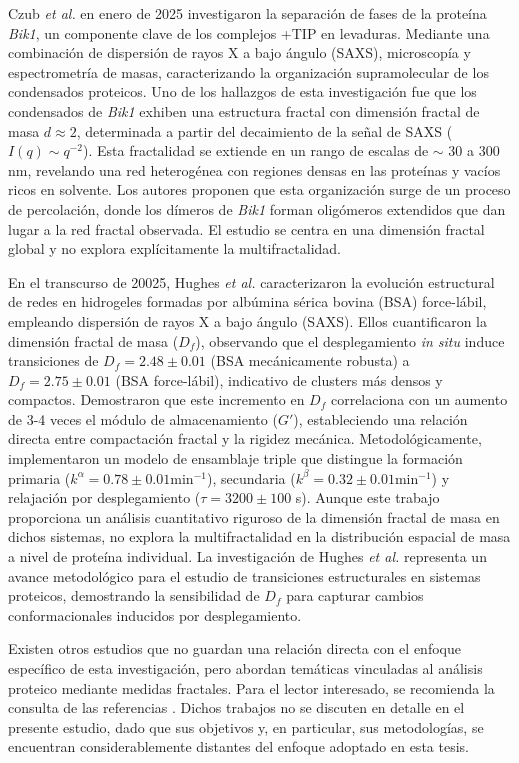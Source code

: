 Czub \textit{et al.} en enero de 2025 \cite{Czub2025} investigaron la separación de fases de la proteína \textit{Bik1}, un componente clave de los complejos +TIP en levaduras. Mediante una combinación de dispersión de rayos X a bajo ángulo (SAXS), microscopía y espectrometría de masas, caracterizando la organización supramolecular de los condensados proteicos. Uno de los hallazgos de esta investigación fue que los condensados de \textit{Bik1} exhiben una estructura fractal con dimensión fractal de masa $d \approx 2$, determinada a partir del decaimiento de la señal de SAXS  ($I(q) \sim q^{-2}$). Esta fractalidad se extiende en un rango de escalas de $\sim$ 30 a 300 nm, revelando una red heterogénea con regiones densas en las proteínas y vacíos ricos en solvente. Los autores proponen que esta organización surge de un proceso de percolación, donde los dímeros de \textit{Bik1} forman oligómeros extendidos que dan lugar a la red fractal observada. El estudio se centra en una dimensión fractal global y no explora explícitamente la multifractalidad.

En el transcurso de 20025, Hughes \textit{et al.} \cite{Hughes2025} caracterizaron la evolución estructural de redes en hidrogeles formadas por albúmina sérica bovina (BSA) force-lábil, empleando dispersión de rayos X a bajo ángulo (SAXS). Ellos cuantificaron la dimensión fractal de masa ($D_f$), observando que el desplegamiento \textit{in situ} induce transiciones de $D_f = 2.48 \pm 0.01$ (BSA mecánicamente robusta) a $D_f = 2.75 \pm 0.01$ (BSA force-lábil), indicativo de clusters más densos y compactos. Demostraron que este incremento en $D_f$ correlaciona con un aumento de 3-4 veces el módulo de almacenamiento ($G'$), estableciendo una relación directa entre compactación fractal y la rigidez mecánica. Metodológicamente, implementaron un modelo de ensamblaje triple que distingue la formación primaria ($k^\alpha = 0.78 \pm 0.01 $min$^{-1}$), secundaria ($k^\beta = 0.32 \pm 0.01 $min$^{-1}$) y relajación por desplegamiento ($\tau = 3200 \pm 100$ s). Aunque este trabajo proporciona un análisis cuantitativo riguroso de la dimensión fractal de masa en dichos sistemas, no explora la multifractalidad en la distribución espacial de masa a nivel de proteína individual. La investigación de Hughes \textit{et al.} representa un avance metodológico para el estudio de transiciones estructurales en sistemas proteicos, demostrando la sensibilidad de $D_f$ para capturar cambios conformacionales inducidos por desplegamiento.

Existen otros estudios que no guardan una relaci\'{o}n directa con el enfoque espec\'{i}fico de esta investigaci\'{o}n, pero abordan tem\'{a}ticas vinculadas al an\'{a}lisis proteico mediante medidas fractales. Para el lector interesado, se recomienda la consulta de las referencias \cite{Shen2001, Banerji2013, Sendker2024}. Dichos trabajos no se discuten en detalle en el presente estudio, dado que sus objetivos y, en particular, sus metodolog\'{i}as, se encuentran considerablemente distantes del enfoque adoptado en esta tesis.

\color{black}












